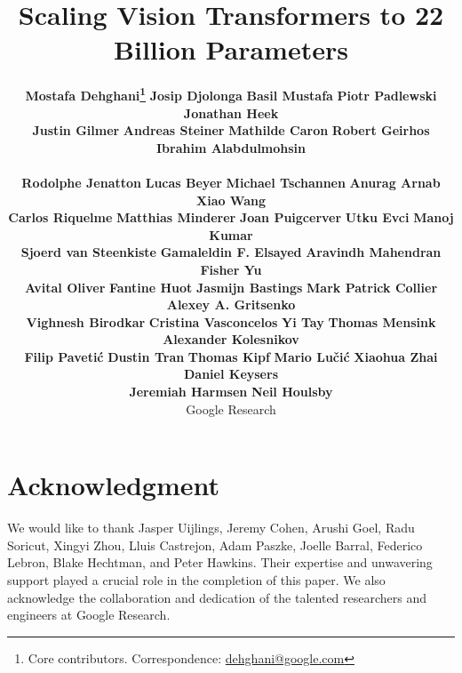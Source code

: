 \documentclass{article}
\title{
\vspace{-10mm}
\textbf{
Scaling Vision Transformers to 22 Billion Parameters
}
\vspace{-3mm}
  }
\author{
\normalsize{}
\textbf{Mostafa Dehghani\thanks{Core contributors. Correspondence: \url{dehghani@google.com}}} \hspace{5mm} 
\textbf{Josip Djolonga\footnotemark[1]} \hspace{3mm} 
\textbf{Basil Mustafa\footnotemark[1]} \hspace{3mm} 
\textbf{Piotr Padlewski\footnotemark[1]} \hspace{3mm} 
\textbf{Jonathan Heek\footnotemark[1]} 
\\
\normalsize{}
\textbf{Justin Gilmer} \hspace{3mm} 
\textbf{Andreas Steiner} \hspace{3mm} 
\textbf{Mathilde Caron} \hspace{3mm} 
\textbf{Robert Geirhos} \hspace{3mm} 
\textbf{Ibrahim  Alabdulmohsin}

\\
\normalsize{}
\textbf{Rodolphe Jenatton} \hspace{3mm} 
\textbf{Lucas Beyer} \hspace{3mm} 
\textbf{Michael Tschannen} \hspace{3mm} 
\textbf{Anurag Arnab} \hspace{3mm} 
\textbf{Xiao Wang}
\\
\normalsize{}
\textbf{Carlos Riquelme} \hspace{3mm} 
\textbf{Matthias Minderer} \hspace{3mm} 
\textbf{Joan Puigcerver} \hspace{3mm} 
\textbf{Utku Evci} \hspace{3mm} 
\textbf{Manoj Kumar}
\\
\normalsize{}
\textbf{Sjoerd van Steenkiste} \hspace{3mm} 
\textbf{Gamaleldin F. Elsayed} \hspace{3mm} 
\textbf{Aravindh Mahendran} \hspace{3mm} 
\textbf{Fisher Yu}
\\
\normalsize{}
\textbf{Avital Oliver} \hspace{3mm} 
\textbf{Fantine Huot} \hspace{3mm} 
\textbf{Jasmijn Bastings} \hspace{3mm} 
\textbf{Mark Patrick Collier} \hspace{3mm} 
\textbf{Alexey A. Gritsenko}
\\
\normalsize{}
\textbf{Vighnesh Birodkar} \hspace{3mm} 
\textbf{Cristina Vasconcelos} \hspace{3mm} 
\textbf{Yi Tay} \hspace{3mm} 
\textbf{Thomas Mensink} \hspace{3mm} 
\textbf{Alexander Kolesnikov}
\\
\normalsize{}
\textbf{Filip Pavetić} \hspace{3mm} 
\textbf{Dustin Tran} \hspace{3mm} 
\textbf{Thomas Kipf} \hspace{3mm} 
\textbf{Mario Lučić} \hspace{3mm} 
\textbf{Xiaohua Zhai} \hspace{3mm} 
\textbf{Daniel Keysers}
\\
\normalsize{}
\textbf{Jeremiah Harmsen} \hspace{3mm} 
\textbf{Neil Houlsby\footnotemark[1]}
\\ 
\vspace{7mm}
\normalsize{}
Google Research
\vspace{-7mm}
}
\date{}
\begin{document}
\setlength{\abovedisplayskip}{4pt}
\setlength{\belowdisplayskip}{4pt}
\setlength{\abovedisplayshortskip}{0pt}
\setlength{\belowdisplayshortskip}{0pt}

\doparttoc %
\faketableofcontents %
\maketitle








\section*{Acknowledgment}
We would like to thank Jasper Uijlings, Jeremy Cohen, Arushi Goel, Radu Soricut, Xingyi Zhou, Lluis Castrejon, Adam Paszke, Joelle Barral, Federico Lebron, Blake Hechtman, and Peter Hawkins. Their expertise and unwavering support played a crucial role in the completion of this paper. We also acknowledge the collaboration and dedication of the talented researchers and engineers at Google Research.





\end{document}
